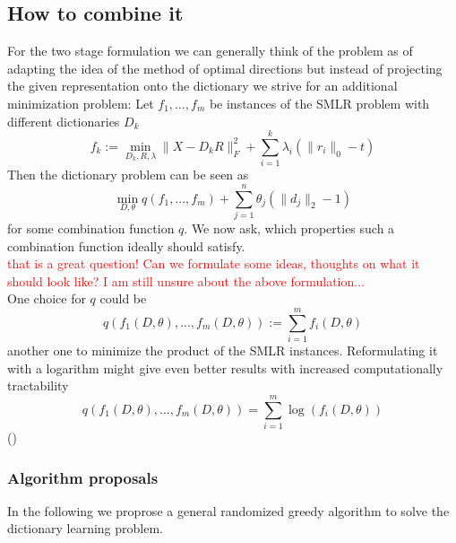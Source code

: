 \documentclass{article}
\begin{document}
\subsection{How to combine it}
For the two stage formulation we can generally think of the problem as of adapting the idea of the method of optimal directions but instead of projecting the given representation onto the dictionary we strive for an additional minimization problem:
Let $f_1, ..., f_m$ be instances of the SMLR problem with different dictionaries $D_k$
\[
f_k := \min_{D_k, R, \lambda} \|X  -D_k R\|_F^2 + \sum_{i=1}^k \lambda_i (\| r_i \|_0 - t)
\]
 Then the dictionary problem can be seen as
\[
\min_{D, \theta} q(f_1, ..., f_m) + \sum_{j=1}^n \theta_j (\| d_j\|_2 - 1)
\]
for some combination function $q$. We now ask, which properties such a combination function ideally should satisfy.
\\
\textcolor{red}{that is a great question! Can we formulate some ideas, thoughts on what it should look like? I am still unsure about the above formulation...}
 \\
 One choice for $q$ could be 
 \[q(f_1(D, \theta), ..., f_m(D, \theta)) := \sum_{i=1}^m f_i(D, \theta)\]
  another one to minimize the product of the SMLR instances. Reformulating it with a logarithm might give even better results with increased computationally tractability 
 \[
 q(f_1(D, \theta), ..., f_m(D, \theta)) = \sum_{i=1}^m \log (f_i(D, \theta))
 \]
 ()
 
 \subsubsection*{Algorithm proposals}
 In the following we proprose a general randomized greedy algorithm to solve the dictionary learning problem.
 
\end{document}

